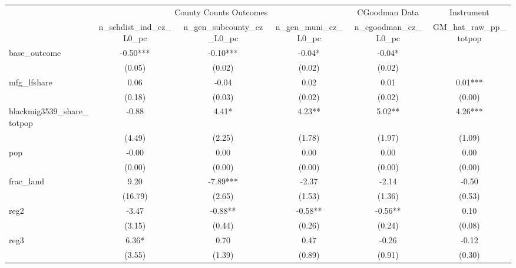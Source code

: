 {
\def\sym#1{\ifmmode^{#1}\else\(^{#1}\)\fi}
\begin{tabular}{l*{5}{c}}
\toprule
                &\multicolumn{3}{c}{County Counts Outcomes}  &\multicolumn{1}{c}{CGoodman Data}&\multicolumn{1}{c}{Instrument}\\\cmidrule(lr){2-4}\cmidrule(lr){5-5}\cmidrule(lr){6-6}
                &\multicolumn{1}{c}{n\_schdist\_ind\_cz\_L0\_pc}&\multicolumn{1}{c}{n\_gen\_subcounty\_cz\_L0\_pc}&\multicolumn{1}{c}{n\_gen\_muni\_cz\_L0\_pc}&\multicolumn{1}{c}{n\_cgoodman\_cz\_L0\_pc}&\multicolumn{1}{c}{GM\_hat\_raw\_pp\_totpop}\\
\midrule
base\_outcome    &      -0.50***&      -0.10***&      -0.04*  &      -0.04*  &              \\
                &     (0.05)   &     (0.02)   &     (0.02)   &     (0.02)   &              \\
\addlinespace
mfg\_lfshare     &       0.06   &      -0.04   &       0.02   &       0.01   &       0.01***\\
                &     (0.18)   &     (0.03)   &     (0.02)   &     (0.02)   &     (0.00)   \\
\addlinespace
blackmig3539\_share\_totpop&      -0.88   &       4.41*  &       4.23** &       5.02** &       4.26***\\
                &     (4.49)   &     (2.25)   &     (1.78)   &     (1.97)   &     (1.09)   \\
\addlinespace
pop             &      -0.00   &       0.00   &       0.00   &       0.00   &       0.00   \\
                &     (0.00)   &     (0.00)   &     (0.00)   &     (0.00)   &     (0.00)   \\
\addlinespace
frac\_land       &       9.20   &      -7.89***&      -2.37   &      -2.14   &      -0.50   \\
                &    (16.79)   &     (2.65)   &     (1.53)   &     (1.36)   &     (0.53)   \\
\addlinespace
reg2            &      -3.47   &      -0.88** &      -0.58** &      -0.56** &       0.10   \\
                &     (3.15)   &     (0.44)   &     (0.26)   &     (0.24)   &     (0.08)   \\
\addlinespace
reg3            &       6.36*  &       0.70   &       0.47   &      -0.26   &      -0.12   \\
                &     (3.55)   &     (1.39)   &     (0.89)   &     (0.91)   &     (0.30)   \\

\end{tabular}}
